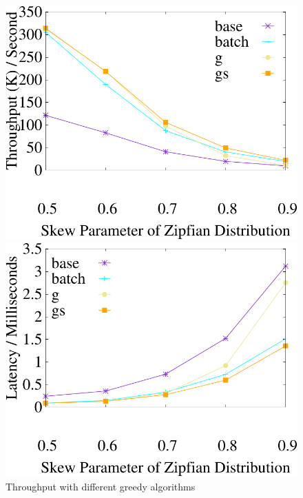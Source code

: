 \begin{figure}[t]
	\centering
    \begin{minipage}[b]{0.31\linewidth}
        \centering
        \includegraphics[width=\textwidth]{./exp_fig/greedy/tps}
        \caption{Throughput with different greedy algorithms}
        \label{fig:greedy:tps}
    \end{minipage}
    \begin{minipage}[b]{0.31\linewidth}
	\centering
	\includegraphics[width=\textwidth]{./exp_fig/greedy/latency}

\end{minipage}
\end{figure}
